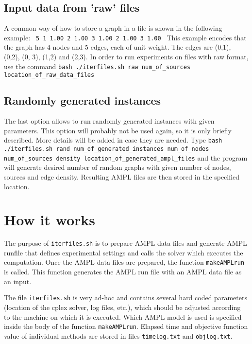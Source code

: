 \documentclass[12pt]{article}
\begin{document}
\subsection{Input data from 'raw' files}

A common way of how to store a graph in a file is shown in the following example:
\texttt{ 5 1 1.00 2 1.00 3 1.00 2 1.00 3 1.00\newline
}
This example encodes that the graph has 4 nodes and 5 edges, each of unit weight. 
The edges are (0,1), (0,2), (0, 3),  (1,2) and  (2,3). 
In order to run experiments on files with raw format, use the command\newline\newline
\texttt{bash ./iterfiles.sh raw num\_of\_sources location\_of\_raw\_data\_files}\newline\newline

\subsection{Randomly generated instances}

The last option allows to run randomly generated instances with given parameters.
This option will probably not be used again, so it is only briefly described. 
More details will be added in case they are needed.
Type \newline\newline
\texttt{bash ./iterfiles.sh rand num\_of\_generated\_instances num\_of\_nodes num\_of\_sources density location\_of\_generated\_ampl\_files}\newline\newline
and the program will generate desired number of random graphs with given number of nodes, sources and edge density. 
Resulting AMPL files are then stored in the specified location.

\section{How it works}

The purpose of \texttt{iterfiles.sh} is to prepare AMPL data files and generate AMPL runfile that defines experimental settings and calls the solver which executes the computation.
Once the AMPL data files are prepared, the function \texttt{makeAMPLrun} is called. 
This function generates the AMPL run file with an AMPL data file as an input.

The file \texttt{iterfiles.sh} is very ad-hoc and contains several hard coded parameters (location of the cplex solver, log files, etc.), which should be adjusted according to the machine on which it is executed.
Which AMPL model is used is specified inside the body of the function \texttt{makeAMPLrun}.	
Elapsed time and objective function value of individual methods are stored in files \texttt{timelog.txt} and \texttt{objlog.txt}.
\end{document}
